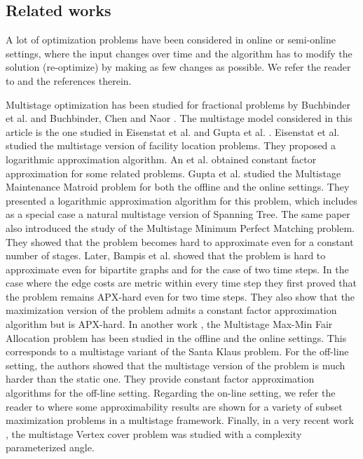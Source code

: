 \documentclass[a4paper]{book}
\begin{document}
\subsection{Related works}



  A lot of optimization
problems have been considered in online or semi-online settings, where the input changes over
time and the algorithm has to modify the solution (re-optimize) by making as few changes
as possible. We refer the reader to \cite{Anthony, Blanchard, Cohen, Gu, Megow, Nagarajan}
 and the references therein. 
 
Multistage optimization has been studied for fractional problems by Buchbinder et
al. 
\cite{Buchbinder} and Buchbinder, Chen and Naor 
\cite{Buchbinder+}. The multistage model considered in this article is the one studied in Eisenstat et al. 
\cite{Eisenstat} and Gupta et al. 
\cite{Gupta}. Eisenstat et al. 
\cite{Eisenstat} studied the multistage version of facility location problems. They proposed a logarithmic approximation algorithm. An et al. 
\cite{An} obtained constant factor approximation for some related problems.
 Gupta et al. 
 \cite{Gupta} studied the {\sc Multistage  Maintenance Matroid} problem for
both the offline and the online settings. They presented a logarithmic approximation
algorithm for this problem, which includes as a special case a natural multistage version of
{\sc Spanning Tree}. The same paper also introduced the study of the {\sc Multistage  Minimum Perfect Matching} problem. They showed that the problem becomes hard to approximate
 even for a constant number of stages. Later, Bampis et al. 
 \cite{Bampis} showed that the problem is
hard to approximate even for bipartite graphs and for the case of two time steps. In the case where the edge costs are metric within every time step they first proved that the problem remains APX-hard even for two time steps. They also show that the maximization version of the problem admits a constant factor approximation algorithm but is APX-hard. In another work
\cite{Bampis+}, the {\sc Multistage Max-Min Fair Allocation}
problem has been studied in the offline and  the online settings. This corresponds to a multistage variant of the {\sc Santa Klaus} problem. For the off-line setting, the authors
showed that the multistage version of the problem is much harder
than the static one. They provide constant factor approximation algorithms for the off-line setting. Regarding the on-line setting, we refer the reader to \cite{esa} where some approximability results are shown for a variety of subset maximization problems in a multistage framework. Finally, in a very recent work \cite{multistagevc}, the {\sc multistage Vertex cover} problem was studied with a complexity parameterized angle.\\
\end{document}
